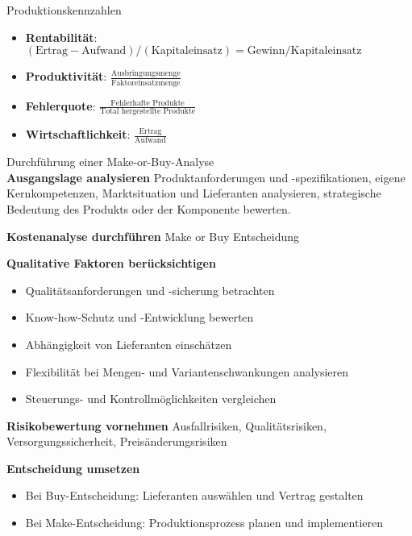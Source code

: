 \begin{definition}{Produktionskennzahlen}
\begin{itemize}
    \item \textbf{Rentabilität}: $(\text{Ertrag} - \text{Aufwand})/(\text{Kapitaleinsatz}) = \text{Gewinn}/\text{Kapitaleinsatz}$
    \item \textbf{Produktivität}: $\frac{\text{Ausbringungsmenge}}{\text{Faktoreinsatzmenge}}$
    \item \textbf{Fehlerquote}: $\frac{\text{Fehlerhafte Produkte}}{\text{Total hergestellte Produkte}}$
    \item \textbf{Wirtschaftlichkeit}: $\frac{\text{Ertrag}}{\text{Aufwand}}$
\end{itemize}
\end{definition}

\begin{KR}{Durchführung einer Make-or-Buy-Analyse}\\
\textbf{Ausgangslage analysieren}
Produktanforderungen und -spezifikationen, eigene Kernkompetenzen, Marktsituation und Lieferanten analysieren, strategische Bedeutung des Produkts oder der Komponente bewerten.


\textbf{Kostenanalyse durchführen} Make or Buy Entscheidung


\textbf{Qualitative Faktoren berücksichtigen}
\begin{itemize}
    \item Qualitätsanforderungen und -sicherung betrachten
    \item Know-how-Schutz und -Entwicklung bewerten
    \item Abhängigkeit von Lieferanten einschätzen
    \item Flexibilität bei Mengen- und Variantenschwankungen analysieren
    \item Steuerungs- und Kontrollmöglichkeiten vergleichen
\end{itemize}

\textbf{Risikobewertung vornehmen}
Ausfallrisiken, Qualitätsrisiken, Versorgungssicherheit, Preisänderungsrisiken


\textbf{Entscheidung umsetzen}
\begin{itemize}
    \item Bei Buy-Entscheidung: Lieferanten auswählen und Vertrag gestalten
    \item Bei Make-Entscheidung: Produktionsprozess planen und implementieren
\end{itemize}
\end{KR}

